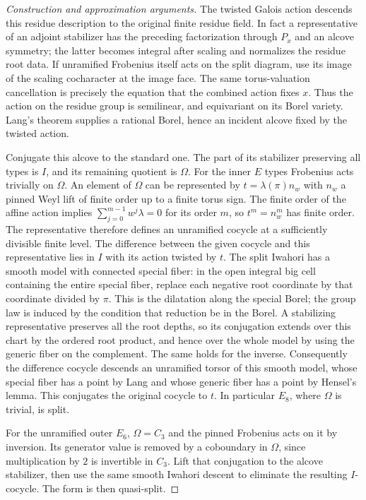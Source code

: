 \documentclass[11pt,a4paper,openany,oneside]{book}
\theoremstyle{resultstyle}
\theoremstyle{definition}
\numberwithin{equation}{chapter}
\begin{document}
\begin{proof}[Construction and approximation arguments]
The twisted Galois action descends this residue description
to the original finite residue field. In fact a representative
of an adjoint stabilizer has the preceding factorization
through \(P_x\) and an alcove symmetry; the latter becomes
integral after scaling and normalizes the residue root
data. If unramified Frobenius itself acts on the split
diagram, use its image of the scaling cocharacter at the
image face. The same torus-valuation cancellation is precisely
the equation that the combined action fixes \(x\). Thus the
action on the residue group is semilinear, and equivariant
on its Borel variety. Lang's theorem supplies a rational
Borel, hence an incident alcove fixed by the twisted action.

Conjugate this alcove to the standard one. The part of its
stabilizer preserving all types is \(I\), and its remaining
quotient is \(\Omega\). For the inner \(E\) types Frobenius
acts trivially on \(\Omega\). An element of \(\Omega\) can
be represented by \(t=\lambda(\pi)n_w\) with \(n_w\) a
pinned Weyl lift of finite order up to a finite torus sign.
The finite order of the affine action implies
\(\sum_{j=0}^{m-1}w^j\lambda=0\) for its order \(m\), so
\(t^m=n_w^m\) has finite order. The representative therefore
defines an unramified cocycle at a sufficiently divisible
finite level. The difference between the given cocycle and
this representative lies in \(I\) with its action twisted
by \(t\). The split Iwahori has a smooth model with connected
special fiber: in the open integral big cell containing the
entire special fiber, replace each negative root coordinate
by that coordinate divided by \(\pi\). This is the dilatation
along the special Borel; the group law is induced by the
condition that reduction be in the Borel. A stabilizing
representative preserves all the root depths, so its
conjugation extends over this chart by the ordered root
product, and hence over the whole model by using the generic
fiber on the complement. The same holds for the inverse.
Consequently the difference cocycle descends an unramified
torsor of this smooth model, whose special fiber has a point
by Lang and whose generic fiber has a point by Hensel's lemma.
This conjugates the original cocycle to \(t\). In particular
\(E_8\), where \(\Omega\) is trivial, is split.

For the unramified outer \(E_6\), \(\Omega=C_3\) and the
pinned Frobenius acts on it by inversion. Its generator
value is removed by a coboundary in \(\Omega\), since
multiplication by \(2\) is invertible in \(C_3\). Lift
that conjugation to the alcove stabilizer, then use the
same smooth Iwahori descent to eliminate the resulting
\(I\)-cocycle. The form is then quasi-split.


\end{proof}
\end{document}
